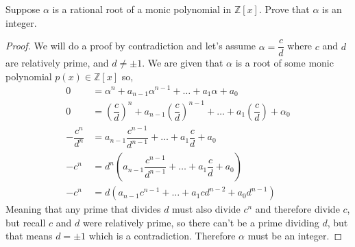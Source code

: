 \documentclass[11pt]{article}
\newenvironment{problem}[2][Problem\!]{\begin{tcolorbox}\begin{trivlist}
\item[\hskip \labelsep {\bfseries #1}\hskip \labelsep {\bfseries #2}]}{\end{trivlist}\end{tcolorbox}}
\newcommand{\zz}{\mathbb Z}   %
\newcommand{\lrp}[1]{\left(#1\right)}
\begin{document}
\begin{problem}{13.1.5}
    Suppose $\alpha$ is a rational root of a monic polynomial in $\zz[x]$. Prove that $\alpha$ is an integer. 
\end{problem}
\begin{proof}
    We will do a proof by contradiction and let's assume $\alpha = \dfrac{c}{d}$ where $c$ and $d$ are relatively prime, and $d \neq \pm 1$. We are given that $\alpha$ is a root of some monic polynomial $p(x)\in \zz[x]$ so,
    \begin{align*}
        0 &= \alpha^{n} + a_{n-1}\alpha^{n-1} + \dots + a_1 \alpha + a_0  \\
        0&= \lrp{\dfrac{c}{d}}^{n} + a_{n-1}\lrp{\dfrac{c}{d}}^{n-1} + \dots + a_1 \lrp{\dfrac{c}{d}} + \alpha_0 \\
        -\dfrac{c^{n}}{d^{n}} &= a_{n-1}\dfrac{c^{n-1}}{d^{n-1}} + \dots + a_1\dfrac{c}{d} + a_0 \\
        -c^{n} &= d^{n}(a_{n-1}\dfrac{c^{n-1}}{d^{n-1}} + \dots + a_1\dfrac{c}{d} + a_0) \\
        -c^{n} &= d(a_{n-1}c^{n-1} + \dots + a_1cd^{n-2} + a_0d^{n-1}) 
    \end{align*}
    Meaning that any prime that divides $d$ must also divide $c^{n}$ and therefore divide $c$, but recall $c$ and $d$ were relatively prime, so there can't be a prime dividing $d$, but that means $d = \pm 1$ which is a contradiction. Therefore $\alpha$ must be an integer. 
\end{proof}
\end{document}
